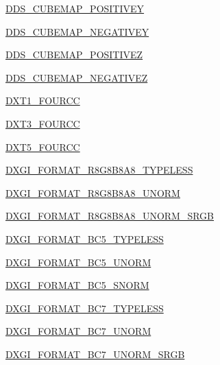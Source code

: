 \begin{DoxyCompactItemize}
\item 
\hyperlink{namespacePIL_1_1DdsImagePlugin_a27575c06f87cb39e5245f37cf24afa40}{D\+D\+S\+\_\+\+C\+U\+B\+E\+M\+A\+P\+\_\+\+P\+O\+S\+I\+T\+I\+V\+EY}
\item 
\hyperlink{namespacePIL_1_1DdsImagePlugin_a96640a8c2cb3c1fbf309c84035fae367}{D\+D\+S\+\_\+\+C\+U\+B\+E\+M\+A\+P\+\_\+\+N\+E\+G\+A\+T\+I\+V\+EY}
\item 
\hyperlink{namespacePIL_1_1DdsImagePlugin_a927f4f2ad375454765ae1ac43ea5f10c}{D\+D\+S\+\_\+\+C\+U\+B\+E\+M\+A\+P\+\_\+\+P\+O\+S\+I\+T\+I\+V\+EZ}
\item 
\hyperlink{namespacePIL_1_1DdsImagePlugin_aa4f5958d27b95807f50def1063b28767}{D\+D\+S\+\_\+\+C\+U\+B\+E\+M\+A\+P\+\_\+\+N\+E\+G\+A\+T\+I\+V\+EZ}
\item 
\hyperlink{namespacePIL_1_1DdsImagePlugin_a15e128e3bbd040a61fe00fbc287d71a7}{D\+X\+T1\+\_\+\+F\+O\+U\+R\+CC}
\item 
\hyperlink{namespacePIL_1_1DdsImagePlugin_aee1f7756b5e4807677a9c2922ed2fdfd}{D\+X\+T3\+\_\+\+F\+O\+U\+R\+CC}
\item 
\hyperlink{namespacePIL_1_1DdsImagePlugin_a0ba19957f3d2071a54743868a6a5058c}{D\+X\+T5\+\_\+\+F\+O\+U\+R\+CC}
\item 
\hyperlink{namespacePIL_1_1DdsImagePlugin_a477c81696a9a8ba728a0eac91f934497}{D\+X\+G\+I\+\_\+\+F\+O\+R\+M\+A\+T\+\_\+\+R8\+G8\+B8\+A8\+\_\+\+T\+Y\+P\+E\+L\+E\+SS}
\item 
\hyperlink{namespacePIL_1_1DdsImagePlugin_ad0d2efd4e9d533e37885fb2fa383a7c2}{D\+X\+G\+I\+\_\+\+F\+O\+R\+M\+A\+T\+\_\+\+R8\+G8\+B8\+A8\+\_\+\+U\+N\+O\+RM}
\item 
\hyperlink{namespacePIL_1_1DdsImagePlugin_a7846c9e535677f7fcbc7a0e82dd70229}{D\+X\+G\+I\+\_\+\+F\+O\+R\+M\+A\+T\+\_\+\+R8\+G8\+B8\+A8\+\_\+\+U\+N\+O\+R\+M\+\_\+\+S\+R\+GB}
\item 
\hyperlink{namespacePIL_1_1DdsImagePlugin_ae45b80d1497258133e06dd3aa5023c9a}{D\+X\+G\+I\+\_\+\+F\+O\+R\+M\+A\+T\+\_\+\+B\+C5\+\_\+\+T\+Y\+P\+E\+L\+E\+SS}
\item 
\hyperlink{namespacePIL_1_1DdsImagePlugin_a274c5d4fee859e8bb0936083b05eab85}{D\+X\+G\+I\+\_\+\+F\+O\+R\+M\+A\+T\+\_\+\+B\+C5\+\_\+\+U\+N\+O\+RM}
\item 
\hyperlink{namespacePIL_1_1DdsImagePlugin_a70527b736b35907124082c7561fc7c81}{D\+X\+G\+I\+\_\+\+F\+O\+R\+M\+A\+T\+\_\+\+B\+C5\+\_\+\+S\+N\+O\+RM}
\item 
\hyperlink{namespacePIL_1_1DdsImagePlugin_a2900e64ae951592ae5911d34b1af201a}{D\+X\+G\+I\+\_\+\+F\+O\+R\+M\+A\+T\+\_\+\+B\+C7\+\_\+\+T\+Y\+P\+E\+L\+E\+SS}
\item 
\hyperlink{namespacePIL_1_1DdsImagePlugin_a54e21d220131f81e682374c6ea3346a8}{D\+X\+G\+I\+\_\+\+F\+O\+R\+M\+A\+T\+\_\+\+B\+C7\+\_\+\+U\+N\+O\+RM}
\item 
\hyperlink{namespacePIL_1_1DdsImagePlugin_a864fbdf059738cec1e5e0de8cd9c7a39}{D\+X\+G\+I\+\_\+\+F\+O\+R\+M\+A\+T\+\_\+\+B\+C7\+\_\+\+U\+N\+O\+R\+M\+\_\+\+S\+R\+GB}
\end{DoxyCompactItemize}


